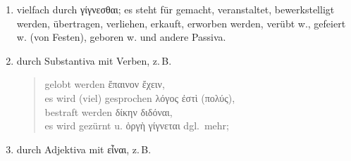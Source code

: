 \begin{enumerate}[leftmargin=0pt,rightmargin=0pt,listparindent =1cm,labelindent=1cm,labelsep=1ex,labelwidth={*},itemindent={*},align=left]
\begin{enumerate}
\begin{quote}
belehrt werden \textgreek[variant=ancient]{μανθάνειν,}\\
gerühmt werden \textgreek[variant=ancient]{εὐδοκιμεῖν,}\\
geplagt werden \textgreek[variant=ancient]{κάμνειν,}\\
vor Gericht gestellt werden \textgreek[variant=ancient]{εἰσιέναι εἰς
δικαστήριον,}\\
verklagt werden \textgreek[variant=ancient]{φεύγειν,}\\
gehalten werden für \ldots{} \textgreek[variant=ancient]{δοκεῖν,}\\
es wird mir etwas zugefügt \textgreek[variant=ancient]{πάσχω τι,}\\
vertrieben werden \textgreek[variant=ancient]{ἐκπίπτειν,}\\
einer Sache beraubt werden \textgreek[variant=ancient]{ἀπολλύναι τι},\\
getödtet werden \textgreek[variant=ancient]{ἀποθνήσκειν},\\
sie wurden vertrieben \textgreek[variant=ancient]{ἀνέστησαν},\\
es wurde mir geantwortet \textgreek[variant=ancient]{ἤκουσα},\\
es wird mir Gutes erwiesen \textgreek[variant=ancient]{εὖ πάσχω},\\
ich ward durch's Loos gewählt \textgreek[variant=ancient]{ἔλαχον},\\
ich ward freigesprochen \textgreek[variant=ancient]{ἀπέφυγον},\\
ich ward geschmäht \textgreek[variant=ancient]{κακῶς ἤκουσα},\\
ich ward (von Mitleid) ergriffen \textgreek[variant=ancient]{(ἔλεός)
με εἰσῄει}.
\end{quote}
\item vielfach durch \textgreek[variant=ancient]{γίγνεσθαι;} es steht für
gemacht, veranstaltet, bewerkstelligt werden, übertragen, verliehen,
erkauft, erworben werden, verübt w., gefeiert w. (von Festen), geboren
w. und andere Passiva.
\item durch Substantiva mit Verben, z.\,B.

\begin{quote}
gelobt werden \textgreek[variant=ancient]{ἔπαινον ἔχειν,}\\
es wird (viel) gesprochen \textgreek[variant=ancient]{λόγος ἐστὶ (πολύς),}\\
bestraft werden \textgreek[variant=ancient]{δίκην διδόναι,}\\
es wird gezürnt u. \textgreek[variant=ancient]{ὀργὴ γίγνεται} dgl.\ mehr;
\end{quote}
\item durch Adjektiva mit \textgreek[variant=ancient]{εἶναι,} z.\,B.


\end{enumerate}
\end{enumerate}
